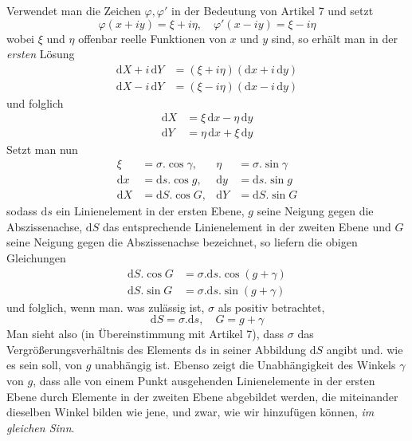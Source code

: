 Verwendet man die Zeichen \(\varphi,\varphi'\) in der Bedeutung von Artikel 7 und setzt
\[
\varphi(x+iy)=\xi+i\eta,\quad\varphi'(x-iy)=\xi-i\eta
\]
\noindent wobei \(\xi\) und \(\eta\) offenbar reelle Funktionen von \(x\) und \(y\) sind, so erhält man in der \textit{ersten} Lösung
\[
\begin{aligned}
\mathrm{d}X+i\,\mathrm{d}Y&=(\xi+i\eta)(\mathrm{d}x+i\,\mathrm{d}y)\\
\mathrm{d}X-i\,\mathrm{d}Y&=(\xi-i\eta)(\mathrm{d}x-i\,\mathrm{d}y)
\end{aligned}
\]
\noindent und folglich
\[
\begin{aligned}
\mathrm{d}X&=\xi\,\mathrm{d}x-\eta\,\mathrm{d}y\\
\mathrm{d}Y&=\eta\,\mathrm{d}x+\xi\,\mathrm{d}y
\end{aligned}
\]
\noindent Setzt man nun
\[
\begin{aligned}
\xi&=\sigma\mathord{.}\cos\gamma,&\eta&=\sigma\mathord{.}\sin\gamma\\
\mathrm{d}x&=\mathrm{d}s\mathord{.}\cos g,&\mathrm{d}y&=\mathrm{d}s\mathord{.}\sin g\\
\mathrm{d}X&=\mathrm{d}S\mathord{.}\cos G,&\mathrm{d}Y&=\mathrm{d}S\mathord{.}\sin G
\end{aligned}
\]
\noindent sodass \(\mathrm{d}s\) ein Linienelement in der ersten Ebene, \(g\) seine Neigung gegen die Abszissenachse, \(\mathrm{d}S\) das entsprechende Linienelement in der zweiten Ebene und \(G\) seine Neigung gegen die Abszissenachse bezeichnet, so liefern die obigen Gleichungen
\[
\begin{aligned}
\mathrm{d}S\mathord{.}\cos G&=\sigma\mathord{.}\mathrm{d}s\mathord{.}\cos(g+\gamma)\\
\mathrm{d}S\mathord{.}\sin G&=\sigma\mathord{.}\mathrm{d}s\mathord{.}\sin(g+\gamma)
\end{aligned}
\]
\noindent und folglich, wenn man. was zulässig ist, \(\sigma\) als positiv betrachtet,
\[
\mathrm{d}S=\sigma\mathord{.}\mathrm{d}s,\quad G=g+\gamma
\]
\noindent Man sieht also (in Übereinstimmung mit Artikel 7), dass \(\sigma\) das Vergrößerungsverhältnis des Elements \(\mathrm{d}s\) in seiner Abbildung \(\mathrm{d}S\) angibt und. wie es sein soll, von \(g\) unabhängig ist. Ebenso zeigt die Unabhängigkeit des Winkels \(\gamma\) von \(g\), dass alle von einem Punkt ausgehenden Linienelemente in der ersten Ebene
durch Elemente in der zweiten Ebene abgebildet werden, die miteinander dieselben Winkel bilden wie jene, und zwar, wie wir hinzufügen können, \textit{im gleichen Sinn}.

